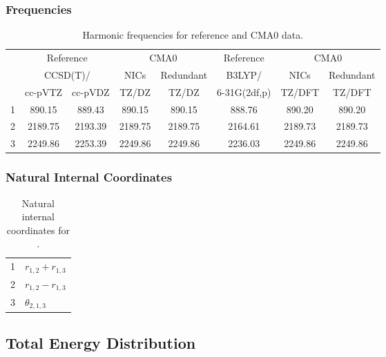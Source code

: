 \documentclass[10pt,oneside]{article}
\begin{document}
\begin{table}[h!]
\subsubsection*{Frequencies}
\centering
\caption{Harmonic frequencies for reference and CMA0 data.}
\begin{tabular}{cccccccc}
\toprule
{} & \multicolumn{2}{c}{Reference} & \multicolumn{2}{c}{CMA0} &    Reference & \multicolumn{2}{c}{CMA0} \\
{} & \multicolumn{2}{c}{CCSD(T)/} &    NICs &  Redundant &       B3LYP/ &    NICs & Redundant \\
{} &   cc-pVTZ & cc-pVDZ &   TZ/DZ &      TZ/DZ & 6-31G(2df,p) &  TZ/DFT &    TZ/DFT \\
\midrule
1 &    890.15 &  889.43 &  890.15 &     890.15 &       888.76 &  890.20 &    890.20 \\
2 &   2189.75 & 2193.39 & 2189.75 &    2189.75 &      2164.61 & 2189.73 &   2189.73 \\
3 &   2249.86 & 2253.39 & 2249.86 &    2249.86 &      2236.03 & 2249.86 &   2249.86 \\
\bottomrule
\end{tabular}
\end{table}

\begin{table}[h!]
\subsubsection*{Natural Internal Coordinates}
\centering
\caption{Natural internal coordinates for .}
\small
\begin{tabular}{ll}
\toprule
  1   & $r_{1,2} + r_{1,3}$ \\
  2   & $r_{1,2} - r_{1,3}$ \\
  3   & $\theta_{2,1,3}$ \\
\bottomrule
\end{tabular}
\end{table}

\begin{table}
\subsection*{Total Energy Distribution}
\centering\end{table}

\clearpage

\subsection{}
\end{document}
